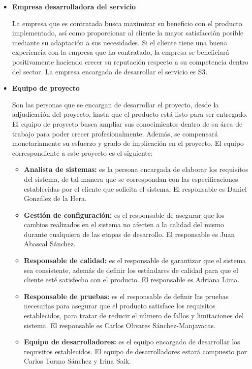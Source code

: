 \begin{itemize}[-]
\item \textbf{Empresa desarrolladora del servicio}
\par La empresa que es contratada busca maximizar su beneficio con el producto implementado, así como proporcionar al cliente la mayor satisfacción posible mediante su adaptación a sus necesidades. Si el cliente tiene una buena experiencia con la empresa que ha contratado, la empresa se beneficiará positivamente haciendo crecer su reputación respecto a su competencia dentro del sector. La empresa encargada de desarrollar el servicio es S3.
\item \textbf{Equipo de proyecto}
\par Son las personas que se encargan de desarrollar el proyecto, desde la adjudicación del proyecto, hasta que el producto está listo para ser entregado. El equipo de proyecto busca ampliar sus conocimientos dentro de su área de trabajo para poder crecer profesionalmente. Además, se compensará monetariamente su esfuerzo y grado de implicación en el proyecto. El equipo correspondiente a este proyecto es el siguiente:
\begin{itemize}[-]
\item \textbf{Analista de sistemas:}
es la persona encargada de elaborar los requisitos del sistema, de tal manera que se correspondan con las especificaciones establecidas por el cliente que solicita el sistema. El responsable es Daniel González de la Hera.
\item \textbf{Gestión de configuración:}
es el responsable de asegurar que los cambios realizados en el sistema no afecten a la calidad del mismo durante cualquiera de las etapas de desarrollo. El responsable es Juan Abascal Sánchez.
\item \textbf{Responsable de calidad:}
es el responsable de garantizar que el sistema sea consistente, además de definir los estándares de calidad para que el cliente esté satisfecho con el producto. El responsable es Adriana Lima.
\item \textbf{Responsable de pruebas:}
es el responsable de definir las pruebas necesarias para asegurar que el producto satisface los requisitos establecidos, para tratar de reducir el número de fallos y limitaciones del sistema. El responsable es Carlos Olivares Sánchez-Manjavacas.
\item \textbf{Equipo de desarrolladores:}
es el equipo encargado de desarrollar los requisitos establecidos. El equipo de desarrolladores estará compuesto por Carlos Tormo Sánchez y Irina Saik.

\end{itemize}
\end{itemize}
